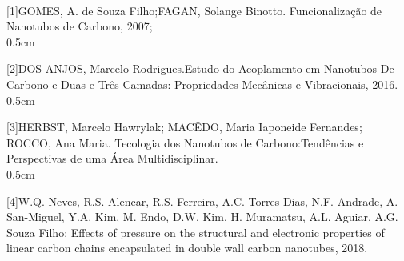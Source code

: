 \documentclass[12pt,a4paper]{report}
\begin{document}
\paragraph{}
[1]GOMES, A. de Souza Filho;FAGAN, Solange Binotto. Funcionalização de Nanotubos de Carbono, 2007;\\{0.5cm}

[2]DOS ANJOS, Marcelo Rodrigues.Estudo do Acoplamento em Nanotubos De Carbono e Duas e Três Camadas: Propriedades Mecânicas e Vibracionais, 2016.\\{0.5cm}

[3]HERBST, Marcelo Hawrylak; MACÊDO, Maria Iaponeide Fernandes; ROCCO, Ana Maria. Tecologia dos Nanotubos de Carbono:Tendências e Perspectivas de uma Área Multidisciplinar.\\{0.5cm}

[4]W.Q. Neves, R.S. Alencar, R.S. Ferreira, A.C. Torres-Dias, N.F. Andrade,
A. San-Miguel, Y.A. Kim, M. Endo, D.W. Kim, H. Muramatsu, A.L. Aguiar, A.G. Souza Filho; Effects of pressure on the structural and electronic properties of linear
carbon chains encapsulated in double wall carbon nanotubes, 2018.
\end{document}
